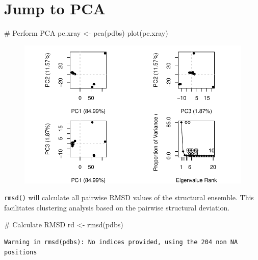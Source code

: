 \documentclass[
  letterpaper,
  DIV=11,
  numbers=noendperiod]{scrartcl}
\newenvironment{Shaded}{\begin{snugshade}}{\end{snugshade}}
\newcommand{\CommentTok}[1]{\textcolor[rgb]{0.37,0.37,0.37}{#1}}
\newcommand{\FunctionTok}[1]{\textcolor[rgb]{0.28,0.35,0.67}{#1}}
\newcommand{\NormalTok}[1]{\textcolor[rgb]{0.00,0.23,0.31}{#1}}
\newcommand{\OtherTok}[1]{\textcolor[rgb]{0.00,0.23,0.31}{#1}}
\begin{document}
\hypertarget{jump-to-pca}{%
\section{Jump to PCA}\label{jump-to-pca}}

\begin{Shaded}
\begin{Highlighting}[]
\CommentTok{\# Perform PCA}
\NormalTok{pc.xray }\OtherTok{\textless{}{-}} \FunctionTok{pca}\NormalTok{(pdbs)}
\FunctionTok{plot}\NormalTok{(pc.xray)}
\end{Highlighting}
\end{Shaded}

\begin{figure}[H]

{\centering \includegraphics{Class09_html_files/figure-pdf/unnamed-chunk-14-1.pdf}

}

\end{figure}

\texttt{rmsd()} will calculate all pairwise RMSD values of the
structural ensemble. This facilitates clustering analysis based on the
pairwise structural deviation.

\begin{Shaded}
\begin{Highlighting}[]
\CommentTok{\# Calculate RMSD}
\NormalTok{rd }\OtherTok{\textless{}{-}} \FunctionTok{rmsd}\NormalTok{(pdbs)}
\end{Highlighting}
\end{Shaded}

\begin{verbatim}
Warning in rmsd(pdbs): No indices provided, using the 204 non NA positions
\end{verbatim}
\end{document}
